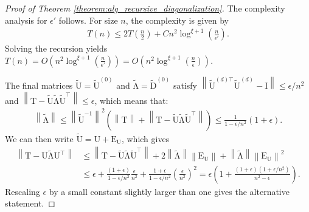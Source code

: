 \documentclass{article}
\newcommand{\lnorm}{\left\|}
\newcommand{\rnorm}{\right\|}
\newcommand{\lpar}{\left(}
\newcommand{\rpar}{\right)}
\newcommand\matE{\boldsymbol{\mathrm{E}}}
\newcommand\matI{\boldsymbol{\mathrm{I}}}
\newcommand\matT{\boldsymbol{\mathrm{T}}}
\newcommand\matU{\boldsymbol{\mathrm{U}}}
\newcommand\matDtilde{\widetilde{\boldsymbol{\mathrm{D}}}}
\newcommand\matUtilde{\widetilde{\boldsymbol{\mathrm{U}}}}
\newcommand\matLambdatilde{\widetilde{\boldsymbol{\mathrm{\Lambda}}}}
\newcommand{\cfmm}{\xi}
\begin{document}
\begin{proof}[Proof of Theorem \ref{theorem:alg_recursive_diagonalization}]
    The complexity analysis for $\epsilon'$ follows. For size $n$, the complexity is given by
    \begin{align*}
        T(n) \leq 2T(\tfrac{n}{2}) 
        + 
        C n^2\log^{\cfmm+1}(\tfrac{n}{\epsilon'})
        .
    \end{align*}
    Solving the recursion yields $T(n)=
    O\lpar
        n^2\log^{\cfmm+1}(\tfrac{n}{\epsilon'})
    \rpar
    =
    O\lpar
        n^2\log^{\cfmm+1}(\tfrac{n}{\epsilon})
    \rpar
    $.
    

    The final matrices $\matUtilde=\matUtilde^{(0)}$ and $\matLambdatilde=\matDtilde^{(0)}$ satisfy 
    $\lnorm\matUtilde^{(d)\top}\matUtilde^{(d)}-\matI\rnorm\leq \epsilon/n^2$
    and
    $\lnorm \matT-\matUtilde\matLambdatilde\matUtilde^\top \rnorm
        \leq
        \epsilon$, which means that:
    \begin{align*}
        \lnorm \matLambdatilde \rnorm
        \leq
        \lnorm 
            \matUtilde^{-1} 
        \rnorm^2 
        \lpar 
            \lnorm \matT\rnorm + 
            \lnorm \matT-\matUtilde\matLambdatilde\matUtilde^\top \rnorm
        \rpar
        \leq
        \frac{1}{1-\epsilon/n^2} (1 + \epsilon).
    \end{align*}
    We can then write $\matUtilde=\matU+\matE_{\matU}$, which gives
    \begin{align*}
        \lnorm
        \matT-\matU\matLambdatilde\matU^\top
        \rnorm
        &\leq
        \lnorm
        \matT-\matUtilde\matLambdatilde\matUtilde^\top
        \rnorm
        +
        2\lnorm\matLambdatilde\rnorm\lnorm\matE_{\matU}\rnorm
        +
        \lnorm\matLambdatilde\rnorm\lnorm\matE_{\matU}\rnorm^2
        \\
        &\leq
        \epsilon + \frac{(1+\epsilon)}{1-\epsilon/n^2}\frac{\epsilon}{n^2} + \frac{1+\epsilon}{1-\epsilon/n^2}\lpar \frac{\epsilon}{n^2}\rpar^2
        =
        \epsilon \lpar
            1
            +
            \frac{(1+\epsilon)(1+\epsilon/n^2)}{n^2-\epsilon}
        \rpar.
    \end{align*}
    Rescaling $\epsilon$ by a small constant slightly larger than one gives the alternative statement.
    \end{proof}
\end{document}
